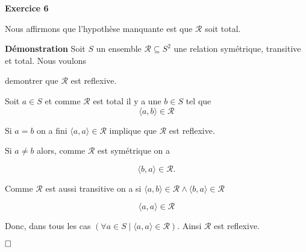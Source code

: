 \documentclass{article}
\begin{document}
\textbf{Exercice 6}

\vspace{0.5cm}

Nous affirmons que l’hypothèse manquante est que $\mathcal{R}$ soit total.

\vspace{0.5cm}

\textbf{Démonstration} Soit $S$ un ensemble $\mathcal{R} \subseteq S^2 $ une relation symétrique, transitive et total. Nous voulons 

demontrer que \( \mathcal{R} \) est reflexive.

Soit $a \in S $ et comme $ \mathcal{R} $ est total il y a une $b \in S$ tel que 
$$ \langle a, b \rangle \in \mathcal{R} $$

Si $a = b$ on a fini $ \langle a,a \rangle \in \mathcal{R}$ implique que $ \mathcal{R}$ est reflexive.

Si $a \neq b$ alors, comme $ \mathcal{R} $ est symétrique on a

$$\langle b,a \rangle \in \mathcal{R}.$$

Comme $\mathcal{R}$ est aussi transitive on a si $ \langle a,b \rangle \in \mathcal{R} \land \langle b,a \rangle \in \mathcal{R}$

$$\langle a,a \rangle \in \mathcal{R}$$

Donc, dans tous les cas $( \forall a \in S \mid \langle a,a \rangle \in \mathcal{R} ) $. Ainsi $ \mathcal{R}$ est reflexive.

$\hfill \square$
\end{document}
